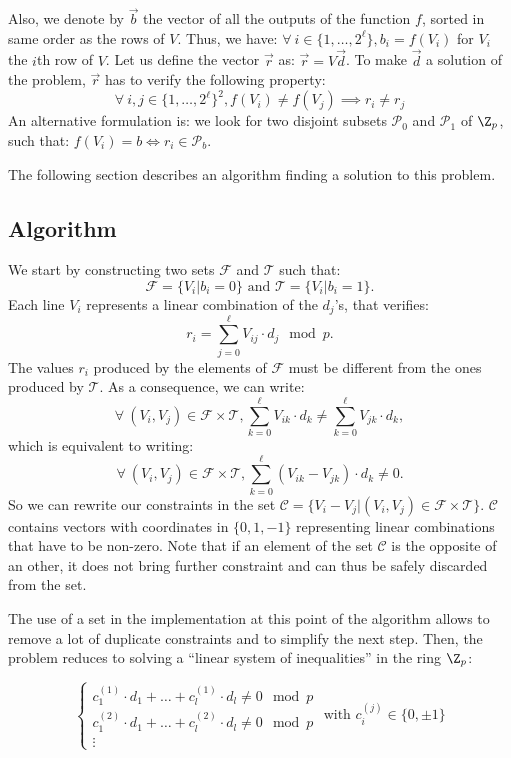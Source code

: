 Also, we denote by $\Vec{b}$ the vector of all the outputs of the function $f$, sorted in same order as the rows of $V$. Thus, we have: $\forall~i \in \{1, \dots, 2^\ell\}, b_i = f(V_i)$
for $V_i$ the $i$th row of $V$. Let us define the vector $\vec r$ as: $\Vec{r} = V \vec{d}$. To make $\vec d$ a solution of the problem, $\vec r$ has to verify the following property:
\[
\forall~i, j \in \{1, \dots, 2^\ell\}^2, f(V_i) \neq f(V_j) \implies r_i \neq r_j   
\]
An alternative formulation is: we look for two disjoint subsets $\mathcal{P}_0$ and $\mathcal{P}_1$ of $\Z_p$, such that: $f(V_i) = b \Longleftrightarrow r_i \in \mathcal P_b$.

The following section describes an algorithm finding a solution to this problem.

\subsection{Algorithm}
\label{sec:search_algorithm}

We start by constructing two sets $\mathcal F$ and $\mathcal T$ such that: \[\mathcal F = \{V_i \vert b_i = 0\} \text{ and } \mathcal T = \{V_i \vert b_i = 1\}.\]
Each line $V_i$ represents a linear combination of the $d_j$'s, that verifies:
\[r_i = \sum_{j=0}^{\ell} V_{ij} \cdot d_j \mod p.\]
The values $r_i$ produced by the elements of $\mathcal{F}$ must be different from the ones produced by $\mathcal{T}$. As a consequence, we can write:
\[\forall~(V_i, V_j) \in \mathcal F \times \mathcal T, \sum_{k=0}^\ell V_{ik} \cdot d_k \neq \sum_{k=0}^\ell V_{jk} \cdot d_k,\] which is equivalent to writing:
\[\forall~(V_i, V_j) \in \mathcal F \times \mathcal T, \sum_{k=0}^\ell (V_{ik} - V_{jk}) \cdot d_k \neq 0.\]
So we can rewrite our constraints in the set $\mathcal C =  \{V_i - V_j \vert (V_i, V_j) \in \mathcal F \times \mathcal T\}.$ $\mathcal{C}$ contains vectors with coordinates in $\{0, 1, -1\}$ representing linear combinations that have to be non-zero. Note that if an element of the set $\mathcal{C}$ is the opposite of an other, it does not bring further constraint and can thus be safely discarded from the set.

The use of a set in the implementation at this point of the algorithm allows to remove a lot of duplicate constraints and to simplify the next step. Then, the problem reduces to solving a ``linear system of inequalities'' in the ring $\Z_p$: 

$$
\begin{cases}
    c_1^{(1)} \cdot d_1 + \dots + c_l^{(1)} \cdot d_l \ne 0 \mod p \\
    c_1^{(2)} \cdot d_1 + \dots + c_l^{(2)} \cdot d_l \ne 0 \mod p\\
    \vdots
\end{cases} \text{ with }
c_i^{(j)} \in \{0, \pm 1\}
$$


